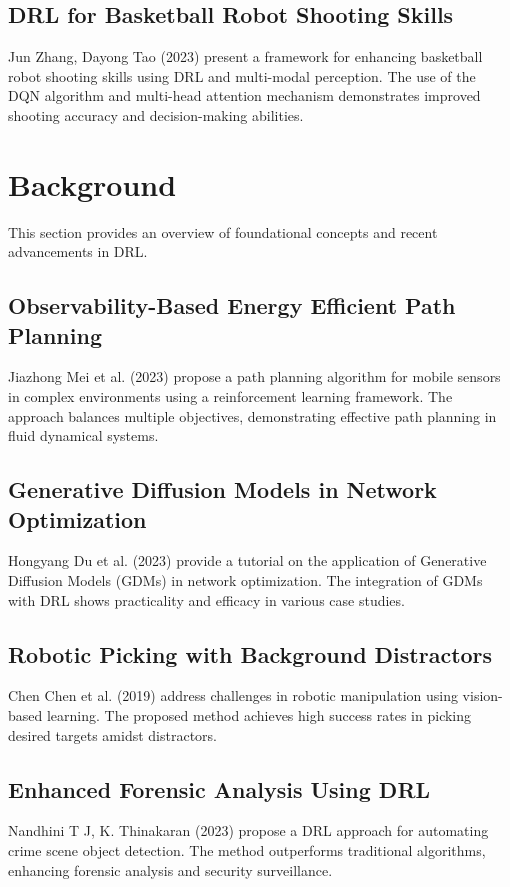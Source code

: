 \documentclass{article}
\begin{document}
\subsection{DRL for Basketball Robot Shooting Skills}
Jun Zhang, Dayong Tao (2023) present a framework for enhancing basketball robot shooting skills using DRL and multi-modal perception. The use of the DQN algorithm and multi-head attention mechanism demonstrates improved shooting accuracy and decision-making abilities.

\section{Background}
This section provides an overview of foundational concepts and recent advancements in DRL.

\subsection{Observability-Based Energy Efficient Path Planning}
Jiazhong Mei et al. (2023) propose a path planning algorithm for mobile sensors in complex environments using a reinforcement learning framework. The approach balances multiple objectives, demonstrating effective path planning in fluid dynamical systems.

\subsection{Generative Diffusion Models in Network Optimization}
Hongyang Du et al. (2023) provide a tutorial on the application of Generative Diffusion Models (GDMs) in network optimization. The integration of GDMs with DRL shows practicality and efficacy in various case studies.

\subsection{Robotic Picking with Background Distractors}
Chen Chen et al. (2019) address challenges in robotic manipulation using vision-based learning. The proposed method achieves high success rates in picking desired targets amidst distractors.

\subsection{Enhanced Forensic Analysis Using DRL}
Nandhini T J, K. Thinakaran (2023) propose a DRL approach for automating crime scene object detection. The method outperforms traditional algorithms, enhancing forensic analysis and security surveillance.
\end{document}
